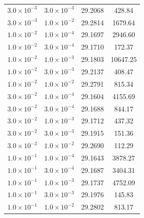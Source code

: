 \documentclass[10pt,a4paper]{article}
\begin{document}
\begin{table}[H]
\begin{tabular}{cccc}
$3.0 \times 10^{-3}$ & $3.0 \times 10^{-3}$ & 29.2068 & 428.84 \\
$3.0 \times 10^{-3}$ & $1.0 \times 10^{-2}$ & 29.2814 & 1679.64 \\
$1.0 \times 10^{-2}$ & $1.0 \times 10^{-4}$ & 29.1697 & 2946.60 \\
$1.0 \times 10^{-2}$ & $3.0 \times 10^{-4}$ & 29.1710 & 172.37 \\
$1.0 \times 10^{-2}$ & $1.0 \times 10^{-3}$ & 29.1803 & 10647.25 \\
$1.0 \times 10^{-2}$ & $3.0 \times 10^{-3}$ & 29.2137 & 408.47 \\
$1.0 \times 10^{-2}$ & $1.0 \times 10^{-2}$ & 29.2791 & 815.34 \\
$3.0 \times 10^{-2}$ & $1.0 \times 10^{-4}$ & 29.1604 & 4155.69 \\
$3.0 \times 10^{-2}$ & $3.0 \times 10^{-4}$ & 29.1688 & 844.17 \\
$3.0 \times 10^{-2}$ & $1.0 \times 10^{-3}$ & 29.1712 & 437.32 \\
$3.0 \times 10^{-2}$ & $3.0 \times 10^{-3}$ & 29.1915 & 151.36 \\
$3.0 \times 10^{-2}$ & $1.0 \times 10^{-2}$ & 29.2690 & 112.29 \\
$1.0 \times 10^{-1}$ & $1.0 \times 10^{-4}$ & 29.1643 & 3878.27 \\
$1.0 \times 10^{-1}$ & $3.0 \times 10^{-4}$ & 29.1687 & 3404.31 \\
$1.0 \times 10^{-1}$ & $1.0 \times 10^{-3}$ & 29.1737 & 4752.09 \\
$1.0 \times 10^{-1}$ & $3.0 \times 10^{-3}$ & 29.1976 & 145.83 \\
$1.0 \times 10^{-1}$ & $1.0 \times 10^{-2}$ & 29.2802 & 813.17 \\
\hline
\end{tabular}
\label{tab:sensitivity}
\end{table}
\end{document}
